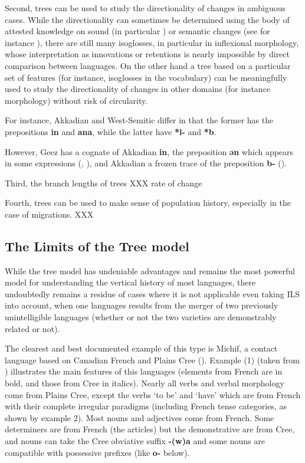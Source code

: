 \documentclass[svgnames,12pt]{scrartcl}
\newcommand{\ipa}[1]{\textbf{{\phon\mbox{#1}}}}
\begin{document}
Second, trees can be used to study the directionality of changes in ambiguous cases. While the directionality can sometimes be determined using the body of attested knowledge on sound (in particular \citealt{kuemmel07wandel}) or semantic changes (see for instance \citealt{urban11semantic}), there are still many isoglosses, in particular in inflexional morphology, whose interpretation as innovations or retentions is nearly impossible by direct comparison between languages. On the other hand a tree based on a particular set of features (for instance, isoglosses in the vocabulary) can be meaningfully used to study the directionality of changes in other domains (for instance morphology) without risk of circularity.


For instance, Akkadian and West-Semitic differ in that the former has the prepositions \ipa{in} and \ipa{ana}, while the latter have \ipa{*l-} and \ipa{*b}. 

However, Geez has a cognate of Akkadian \ipa{in}, the preposition \ipa{ən} which appears in some expressions (\citealt[16]{huehnergard06protosemitic}, \citet[119]{kogan15semitic}), and Akkadian a frozen trace of the preposition \ipa{b-} (\citealt[45-6]{rubin05semitic}). 

 

 

Third, the branch lengths of trees XXX rate of change

Fourth, trees can be used to make sense of population history, especially in the case of migrations. XXX

\subsection{The Limits of the Tree model} \label{sec:limits}
While the tree model has undeniable advantages and remains the most powerful model for understanding the vertical history of most languages, there undoubtedly remains a residue of cases where it is not applicable even taking ILS into account, when one languages results from the merger of two previously unintelligible languages (whether or not the two varieties are demonstrably related or not).

The clearest and best documented example of this type is Michif, a contact language based on Canadian French and Plains Cree (\citealt{bakker97michif}). Example (1) (taken from \citealt{antonov15michif}) illustrates the main features of this languages (elements from French are in bold, and those from Cree in italics). Nearly all verbs and verbal morphology come from Plains Cree, except the verbs `to be' and `have' which are from French with their complete irregular paradigms (including French tense categories, as shown by example 2). Most nouns and adjectives come from French. Some determiners are from French (the articles) but the demonstrative are from Cree, and nouns can take the Cree obviative suffix \ipa{-(w)a} and some nouns are compatible with possessive prefixes (like \ipa{o-} below). 
\end{document}
